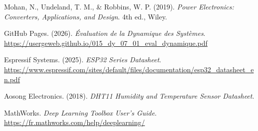 \begin{enumerate}[label={[\arabic*]}]
	\item Mohan, N., Undeland, T. M., \& Robbins, W. P. (2019). \textit{Power Electronics: Converters, Applications, and Design}. 4th ed., Wiley.
	
	
	\item GitHub Pages. (2026). \textit{Évaluation de la Dynamique des Systèmes}. \url{https://usergeweb.github.io/015_dy_07_01_eval_dynamique.pdf}
	
	\item Espressif Systems. (2025). \textit{ESP32 Series Datasheet}. \url{https://www.espressif.com/sites/default/files/documentation/esp32_datasheet_en.pdf}
	
	\item Aosong Electronics. (2018). \textit{DHT11 Humidity and  Temperature Sensor Datasheet}.
	
	\item MathWorks. \textit{Deep Learning Toolbox User's Guide}. \url{https://fr.mathworks.com/help/deeplearning/}
	
\end{enumerate}